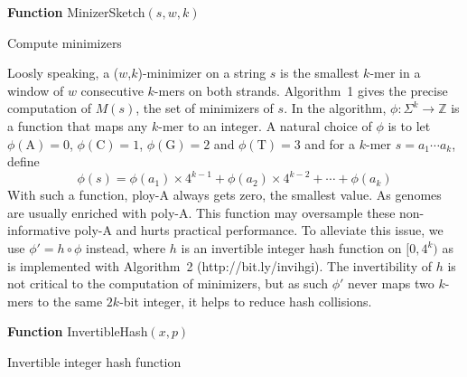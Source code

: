 \documentclass{bioinfo}
\begin{document}
\begin{methods}
\begin{algorithm}[ht]
\DontPrintSemicolon
\footnotesize
{}
\BlankLine
\textbf{Function} {\sc MinizerSketch}$(s,w,k)$
\caption{Compute minimizers}
\end{algorithm}

Loosly speaking, a ($w$,$k$)-minimizer on a string $s$ is the smallest $k$-mer
in a window of $w$ consecutive $k$-mers on both strands. Algorithm~1 gives the
precise computation of $M(s)$, the set of minimizers of $s$. In the algorithm,
$\phi:\Sigma^k\to\mathbb{Z}$ is a function that maps any $k$-mer to an integer.
A natural choice of $\phi$ is to let $\phi(\mathrm{A})=0$,
$\phi(\mathrm{C})=1$, $\phi(\mathrm{G})=2$ and $\phi(\mathrm{T})=3$ and for a
$k$-mer $s=a_1\cdots a_k$, define
$$
\phi(s)=\phi(a_1)\times4^{k-1}+\phi(a_2)\times4^{k-2}+\cdots+\phi(a_k)
$$
With such a function, ploy-A always gets zero, the smallest value.  As genomes
are usually enriched with poly-A. This function may oversample these
non-informative poly-A and hurts practical performance. To alleviate this
issue, we use $\phi'=h\circ\phi$ instead, where $h$ is an invertible integer
hash function on $[0,4^k)$ as is implemented with Algorithm~2
(http://bit.ly/invihgi). The invertibility of $h$ is not critical to the
computation of minimizers, but as such $\phi'$ never maps two $k$-mers to the
same $2k$-bit integer, it helps to reduce hash collisions.

\begin{algorithm}[ht]
\DontPrintSemicolon
\footnotesize
{}
\BlankLine
\textbf{Function} {\sc InvertibleHash}$(x,p)$
\caption{Invertible integer hash function}
\end{algorithm}


\end{methods}
\end{document}
